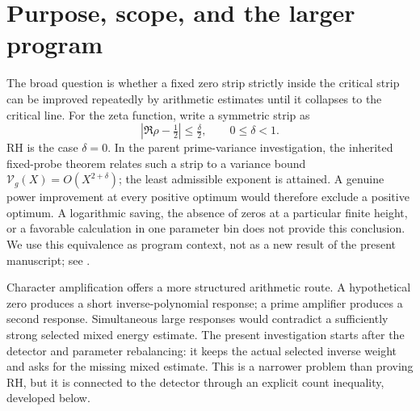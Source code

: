 \documentclass[11pt]{article}
\theoremstyle{definition}
\begin{document}
\begin{abstract}
with saving exceeding $1/700$ on the certified operational region.
Fixed-ray lattice counting makes its auxiliary principal layer negligible
with explicit height costs. Masked completion controls growing nonprincipal
conductors through $U^{m+dr/2-1/1000}$ with saving $1/500$.
Under the global family strip input a larger buffered sector is controlled.
An elementary full-support pair count removes another signed column
sector. A native marked inverse sieve extends auxiliary conductor
control through a valuation-dependent frontier, with all literal
contour costs retained. Further bounds remove small primitive
column quotient conductors, additional higher-defect rows, and
a large sixth-power column tail with its complete cross interaction.
The centered signed high-conductor theorem
remains open.
\end{abstract}
\tableofcontents

\section{Purpose, scope, and the larger program}\label{sec-purpose}
The broad question is whether a fixed zero strip strictly inside the critical strip can be improved repeatedly by arithmetic estimates until it collapses to the critical line. For the zeta function, write a symmetric strip as
\[
 |\Re\rho-\tfrac12|\le\tfrac{\delta}{2},\qquad 0\le\delta<1.
\]
RH is the case $\delta=0$. In the parent prime-variance investigation, the inherited fixed-probe theorem relates such a strip to a variance bound $\mathcal V_g(X)=O(X^{2+\delta})$; the least admissible exponent is attained. A genuine power improvement at every positive optimum would therefore exclude a positive optimum. A logarithmic saving, the absence of zeros at a particular finite height, or a favorable calculation in one parameter bin does not provide this conclusion. We use this equivalence as program context, not as a new result of the present manuscript; see \cite{overview,continuation}.

Character amplification offers a more structured arithmetic route. A hypothetical zero produces a short inverse-polynomial response; a prime amplifier produces a second response. Simultaneous large responses would contradict a sufficiently strong selected mixed energy estimate. The present investigation starts after the detector and parameter rebalancing: it keeps the actual selected inverse weight and asks for the missing mixed estimate. This is a narrower problem than proving RH, but it is connected to the detector through an explicit count inequality, developed below.
\end{document}
